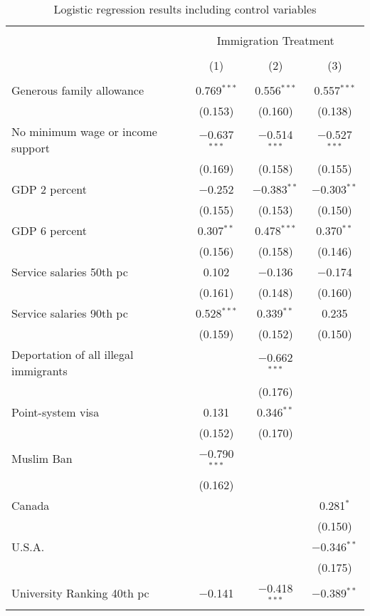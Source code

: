 \documentclass[12pt]{article}
\begin{document}
\begin{appendices}
\begin{table}[H] \centering \small
  \caption{Logistic regression results including control variables} 
  \label{tab:results_controls}
\begin{tabular}{@{\extracolsep{5pt}}lccc} 
\\[-1.8ex]\hline 
\hline \\[-1.8ex] 
 & \multicolumn{3}{c}{Immigration Treatment} \\ 
\cline{2-4} 
\\[-1.8ex] & (1) & (2) & (3)\\ 
\hline \\[-1.8ex] 
Generous family allowance & 0.769$^{***}$ & 0.556$^{***}$ & 0.557$^{***}$ \\ 
  & (0.153) & (0.160) & (0.138) \\ 
  No minimum wage or income support & $-$0.637$^{***}$ & $-$0.514$^{***}$ & $-$0.527$^{***}$ \\ 
  & (0.169) & (0.158) & (0.155) \\ 
  GDP 2 percent & $-$0.252 & $-$0.383$^{**}$ & $-$0.303$^{**}$ \\ 
  & (0.155) & (0.153) & (0.150) \\ 
  GDP 6 percent & 0.307$^{**}$ & 0.478$^{***}$ & 0.370$^{**}$ \\ 
  & (0.156) & (0.158) & (0.146) \\ 
  Service salaries 50th pc & 0.102 & $-$0.136 & $-$0.174 \\ 
  & (0.161) & (0.148) & (0.160) \\ 
  Service salaries 90th pc & 0.528$^{***}$ & 0.339$^{**}$ & 0.235 \\ 
  & (0.159) & (0.152) & (0.150) \\ 
  Deportation of all illegal immigrants &  & $-$0.662$^{***}$ &  \\ 
  &  & (0.176) &  \\ 
  Point-system visa & 0.131 & 0.346$^{**}$ &  \\ 
  & (0.152) & (0.170) &  \\ 
  Muslim Ban & $-$0.790$^{***}$ &  &  \\ 
  & (0.162) &  &  \\ 
  Canada &  &  & 0.281$^{*}$ \\ 
  &  &  & (0.150) \\ 
  U.S.A. &  &  & $-$0.346$^{**}$ \\ 
  &  &  & (0.175) \\ 
  University Ranking 40th pc & $-$0.141 & $-$0.418$^{***}$ & $-$0.389$^{**}$ \\ 

\end{tabular}
\end{table}
\end{appendices}
\end{document}
